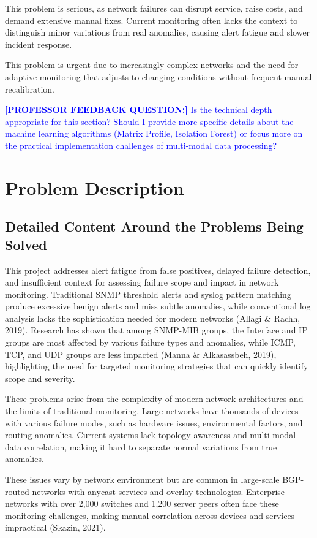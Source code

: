 \documentclass[11pt]{article}
\begin{document}
This problem is serious, as network failures can disrupt service, raise costs, and demand extensive manual fixes. Current monitoring often lacks the context to distinguish minor variations from real anomalies, causing alert fatigue and slower incident response.

This problem is urgent due to increasingly complex networks and the need for adaptive monitoring that adjusts to changing conditions without frequent manual recalibration.

\textcolor{blue}{\textbf{[PROFESSOR FEEDBACK QUESTION:]} Is the technical depth appropriate for this section? Should I provide more specific details about the machine learning algorithms (Matrix Profile, Isolation Forest) or focus more on the practical implementation challenges of multi-modal data processing?}

\section{Problem Description}

\subsection{Detailed Content Around the Problems Being Solved}

This project addresses alert fatigue from false positives, delayed failure detection, and insufficient context for assessing failure scope and impact in network monitoring. Traditional SNMP threshold alerts and syslog pattern matching produce excessive benign alerts and miss subtle anomalies, while conventional log analysis lacks the sophistication needed for modern networks (Allagi \& Rachh, 2019). Research has shown that among SNMP-MIB groups, the Interface and IP groups are most affected by various failure types and anomalies, while ICMP, TCP, and UDP groups are less impacted (Manna \& Alkasassbeh, 2019), highlighting the need for targeted monitoring strategies that can quickly identify scope and severity.

These problems arise from the complexity of modern network architectures and the limits of traditional monitoring. Large networks have thousands of devices with various failure modes, such as hardware issues, environmental factors, and routing anomalies. Current systems lack topology awareness and multi-modal data correlation, making it hard to separate normal variations from true anomalies.

These issues vary by network environment but are common in large-scale BGP-routed networks with anycast services and overlay technologies. Enterprise networks with over 2,000 switches and 1,200 server peers often face these monitoring challenges, making manual correlation across devices and services impractical (Skazin, 2021).
\end{document}
